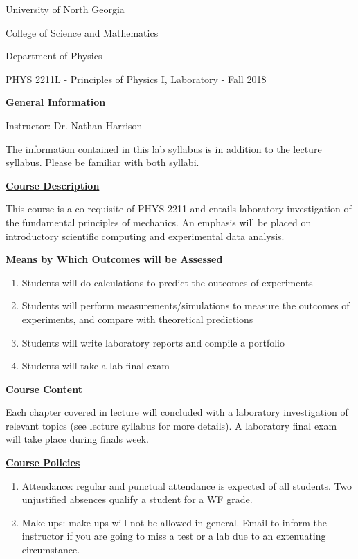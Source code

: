 \documentclass[12pt]{article}
\begin{document}
{\centering
\large University of North Georgia \par
\large College of Science and Mathematics \par
\large Department of Physics \par
\large PHYS 2211L - Principles of Physics I, Laboratory - Fall 2018 \par
}
\hfill \break \vspace{-4mm}

\underline{\textbf{General Information}} \par
Instructor: Dr. Nathan Harrison \par
The information contained in this lab syllabus is in addition to the lecture syllabus. Please be familiar with both syllabi.
\hfill \break

\underline{\textbf{Course Description}} \par
This course is a co-requisite of PHYS 2211 and entails laboratory investigation of the fundamental principles of mechanics.
An emphasis will be placed on introductory scientific computing and experimental data analysis.
\hfill \break

\underline{\textbf{Means by Which Outcomes will be Assessed}} \par
\begin{enumerate}
\item Students will do calculations to predict the outcomes of experiments
\item Students will perform measurements/simulations to measure the outcomes of experiments, and compare with theoretical predictions
\item Students will write laboratory reports and compile a portfolio
\item Students will take a lab final exam
\end{enumerate}

\underline{\textbf{Course Content}} \par
Each chapter covered in lecture will concluded with a laboratory investigation of relevant topics (see lecture syllabus for more details).
A laboratory final exam will take place during finals week.
\hfill \break

\underline{\textbf{Course Policies}} \par
\begin{enumerate}
\item Attendance: regular and punctual attendance is expected of all students. Two unjustified absences qualify a student for a WF grade.
\item Make-ups: make-ups will not be allowed in general. Email to inform the instructor if you are going to miss a test or a lab due to an extenuating circumstance.
\end{enumerate}
\end{document}
